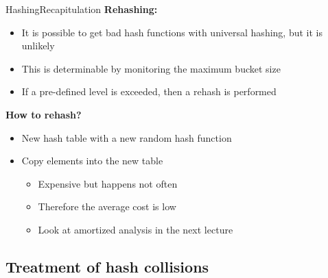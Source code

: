 \begin{frame}{Hashing}{Recapitulation}
  \textbf{Rehashing:}
  \begin{itemize}
    \item<2->
      It is possible to get bad hash functions with universal hashing, but it
      is unlikely
    \item<3->
      This is determinable by monitoring the maximum bucket size

    \item<4-> If a pre-defined level is exceeded, then a {\color{Mittel-Blau}rehash} is performed
  \end{itemize}
  \textbf{How to rehash?}
  \begin{itemize}
    \item<5->
      New hash table with a new random hash function
    \item<6->
      Copy elements into the new table
      \begin{itemize}
        \item<7->
          Expensive but happens not often
        \item<8->
          Therefore the average cost is low
        \item<9->
          Look at {\color{Mittel-Blau}amortized analysis} in the next lecture
      \end{itemize}
  \end{itemize}
\end{frame}


\subsection{Treatment of hash collisions}

